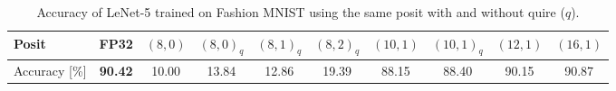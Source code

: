 \begin{table*}[htb]
    \vspace*{-\baselineskip}
    \centering
    \caption{Accuracy of LeNet-5 trained on Fashion MNIST using the same posit with and without quire ($q$).}
    \label{tab:same_posit}
    \begin{tabular}{@{}lccccccccc@{}}
        \toprule
        Posit & \textbf{FP32} & $(8, 0)$ & $(8, 0)_q$ & $(8, 1)_q$ & $(8, 2)_q$ & $(10, 1)$ & $(10, 1)_q$ & $(12, 1)$ & $(16, 1)$ \\ \midrule
        Accuracy [\%] & \textbf{\num{90.42}} & \num{10.00} & \num{13.84} & \num{12.86} & \num{19.39} & \num{88.15} & \num{88.40} & \num{90.15} & \num{90.87} \\ \bottomrule
    \end{tabular}
\end{table*}